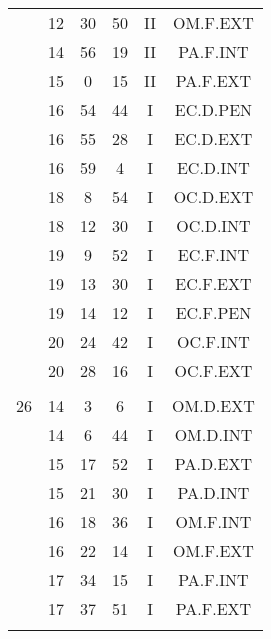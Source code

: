 \documentclass[12pt, a4paper]{article}
\begin{document}
\begin{multicols}{3}
{\begin{tabular}{c c c c c c}
	 	 	 	 & 12 & 30 & 50 & II & OM.F.EXT\\%
	 	 	 	 & 14 & 56 & 19 & II & PA.F.INT\\%
	 	 	 	 & 15 & 0 & 15 & II & PA.F.EXT\\%
	 	 	 	 & 16 & 54 & 44 & I & EC.D.PEN\\%
	 	 	 	 & 16 & 55 & 28 & I & EC.D.EXT\\%
	 	 	 	 & 16 & 59 & 4 & I & EC.D.INT\\%
	 	 	 	 & 18 & 8 & 54 & I & OC.D.EXT\\%
	 	 	 	 & 18 & 12 & 30 & I & OC.D.INT\\%
	 	 	 	 & 19 & 9 & 52 & I & EC.F.INT\\%
	 	 	 	 & 19 & 13 & 30 & I & EC.F.EXT\\%
	 	 	 	 & 19 & 14 & 12 & I & EC.F.PEN\\%
	 	 	 	 & 20 & 24 & 42 & I & OC.F.INT\\%
	 	 	 	 & 20 & 28 & 16 & I & OC.F.EXT\\%
	 	 	 	 & & & & & \\%
	 	 	 	26 & 14 & 3 & 6 & I & OM.D.EXT\\%
	 	 	 	 & 14 & 6 & 44 & I & OM.D.INT\\%
	 	 	 	 & 15 & 17 & 52 & I & PA.D.EXT\\%
	 	 	 	 & 15 & 21 & 30 & I & PA.D.INT\\%
	 	 	 	 & 16 & 18 & 36 & I & OM.F.INT\\%
	 	 	 	 & 16 & 22 & 14 & I & OM.F.EXT\\%
	 	 	 	 & 17 & 34 & 15 & I & PA.F.INT\\%
	 	 	 	 & 17 & 37 & 51 & I & PA.F.EXT\\%
	 	 	 	 & & & & & \\%

\end{tabular}}
\end{multicols}
\end{document}

